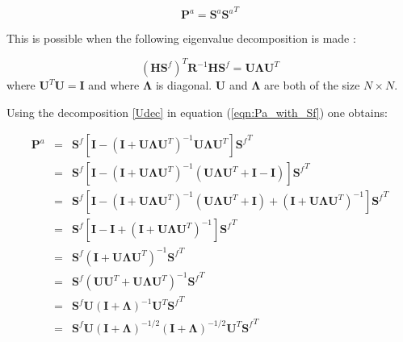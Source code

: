 \documentclass[a4paper,12pt]{article}
\begin{document}
\begin{equation}
 \mathbf P^a = \mathbf S^a {\mathbf S^a}^T
\end{equation}

This is possible when the following eigenvalue decomposition is made :

\begin{equation}
\left(\mathbf H \mathbf S^f\right)^T  \mathbf R^{-1} \mathbf H \mathbf S^f
= 
\mathbf U \mathbf \Lambda \mathbf U^T \label{Udec}
\end{equation} 
where $\mathbf U^T \mathbf U = \mathbf I$ and where $\mathbf \Lambda$ is
diagonal.
 $\mathbf U$ and $\mathbf \Lambda$ are both of the size $N \times N$.\newline  

Using the decomposition \eqref{Udec} in equation (\ref{eqn:Pa_with_Sf}) one obtains:

\begin{eqnarray}
\mathbf{P}^a
&=&
\mathbf S^f
\left[
\mathbf I - 
(\mathbf I+ \mathbf U \mathbf \Lambda \mathbf U^T )^{-1}\mathbf U \mathbf \Lambda \mathbf U^T
\right]
{\mathbf S^f}^T\\
&=&
\mathbf S^f
\left[
\mathbf I - 
(\mathbf I+ \mathbf U \mathbf \Lambda \mathbf U^T )^{-1}
\left( \mathbf U \mathbf \Lambda \mathbf U^T + \mathbf I - \mathbf I\right) 
\right]
{\mathbf S^f}^T\\
&=&
\mathbf S^f
\left[
\mathbf I - 
(\mathbf I+ \mathbf U \mathbf \Lambda \mathbf U^T )^{-1}
\left( \mathbf U \mathbf \Lambda \mathbf U^T + \mathbf I \right) 
 +
(\mathbf I+ \mathbf U \mathbf \Lambda \mathbf U^T )^{-1}
\right]
{\mathbf S^f}^T\\
&=&
\mathbf S^f
\left[
\mathbf I - 
\mathbf I 
 + 
(\mathbf I+ \mathbf U \mathbf \Lambda \mathbf U^T )^{-1}
\right]
{\mathbf S^f}^T \\
&=&
\mathbf S^f
(\mathbf I+ \mathbf U \mathbf \Lambda \mathbf U^T )^{-1}
{\mathbf S^f}^T \\
&=&
\mathbf S^f
(\mathbf U \mathbf U^T+ \mathbf U \mathbf \Lambda \mathbf U^T )^{-1}
{\mathbf S^f}^T \\
&=&
\mathbf S^f \mathbf U
(\mathbf I + \mathbf \Lambda )^{-1}
\mathbf U^T {\mathbf S^f}^T \\
&=&
\mathbf S^f \mathbf U
(\mathbf I + \mathbf \Lambda )^{-1/2}
(\mathbf I + \mathbf \Lambda )^{-1/2}
\mathbf U^T {\mathbf S^f}^T \label{PaSfSft}
\end{eqnarray}
\end{document}
